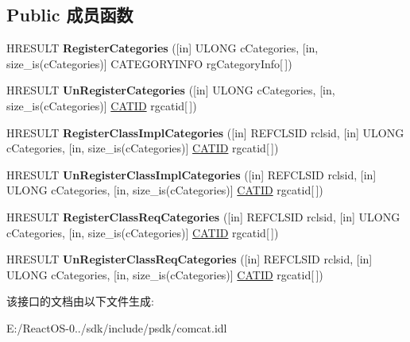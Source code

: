 \subsection*{Public 成员函数}
\begin{DoxyCompactItemize}
\item 
\mbox{\label{interface_i_cat_register_a54bea1743b53ca2c5a8c9146c1510ec3}} 
H\+R\+E\+S\+U\+LT {\bfseries Register\+Categories} (\mbox{[}in\mbox{]} U\+L\+O\+NG c\+Categories, \mbox{[}in, size\+\_\+is(c\+Categories)\mbox{]} C\+A\+T\+E\+G\+O\+R\+Y\+I\+N\+FO rg\+Category\+Info\mbox{[}$\,$\mbox{]})
\item 
\mbox{\label{interface_i_cat_register_a254c567ff9510ef7fa318a1a7ef7b23d}} 
H\+R\+E\+S\+U\+LT {\bfseries Un\+Register\+Categories} (\mbox{[}in\mbox{]} U\+L\+O\+NG c\+Categories, \mbox{[}in, size\+\_\+is(c\+Categories)\mbox{]} \hyperlink{interface_g_u_i_d}{C\+A\+T\+ID} rgcatid\mbox{[}$\,$\mbox{]})
\item 
\mbox{\label{interface_i_cat_register_a705a672dbba122409d51387db4f94906}} 
H\+R\+E\+S\+U\+LT {\bfseries Register\+Class\+Impl\+Categories} (\mbox{[}in\mbox{]} R\+E\+F\+C\+L\+S\+ID rclsid, \mbox{[}in\mbox{]} U\+L\+O\+NG c\+Categories, \mbox{[}in, size\+\_\+is(c\+Categories)\mbox{]} \hyperlink{interface_g_u_i_d}{C\+A\+T\+ID} rgcatid\mbox{[}$\,$\mbox{]})
\item 
\mbox{\label{interface_i_cat_register_a8b4b44d305379cb81d95e7431e6e599f}} 
H\+R\+E\+S\+U\+LT {\bfseries Un\+Register\+Class\+Impl\+Categories} (\mbox{[}in\mbox{]} R\+E\+F\+C\+L\+S\+ID rclsid, \mbox{[}in\mbox{]} U\+L\+O\+NG c\+Categories, \mbox{[}in, size\+\_\+is(c\+Categories)\mbox{]} \hyperlink{interface_g_u_i_d}{C\+A\+T\+ID} rgcatid\mbox{[}$\,$\mbox{]})
\item 
\mbox{\label{interface_i_cat_register_a03c43441ad8a4a007c84337895630b1f}} 
H\+R\+E\+S\+U\+LT {\bfseries Register\+Class\+Req\+Categories} (\mbox{[}in\mbox{]} R\+E\+F\+C\+L\+S\+ID rclsid, \mbox{[}in\mbox{]} U\+L\+O\+NG c\+Categories, \mbox{[}in, size\+\_\+is(c\+Categories)\mbox{]} \hyperlink{interface_g_u_i_d}{C\+A\+T\+ID} rgcatid\mbox{[}$\,$\mbox{]})
\item 
\mbox{\label{interface_i_cat_register_ae8651494e24d2dadd3985e34ae8b0558}} 
H\+R\+E\+S\+U\+LT {\bfseries Un\+Register\+Class\+Req\+Categories} (\mbox{[}in\mbox{]} R\+E\+F\+C\+L\+S\+ID rclsid, \mbox{[}in\mbox{]} U\+L\+O\+NG c\+Categories, \mbox{[}in, size\+\_\+is(c\+Categories)\mbox{]} \hyperlink{interface_g_u_i_d}{C\+A\+T\+ID} rgcatid\mbox{[}$\,$\mbox{]})
\end{DoxyCompactItemize}


该接口的文档由以下文件生成\+:\begin{DoxyCompactItemize}
\item 
E\+:/\+React\+O\+S-\/0../sdk/include/psdk/comcat.\+idl\end{DoxyCompactItemize}
